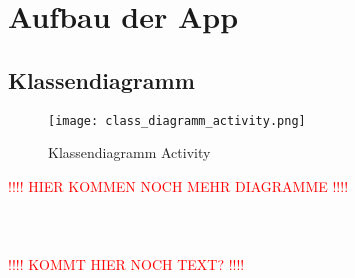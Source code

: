 \newpage
\section{Aufbau der App}

\subsection{Klassendiagramm} 

\begin{figure}[h!]
\label{fig:class_diagramm_activity}
\centering
\texttt{[image: class\_diagramm\_activity.png]} 
\caption{Klassendiagramm Activity}
\end{figure}



\textcolor{red}{!!!! HIER KOMMEN NOCH MEHR DIAGRAMME !!!!} \\ \\ \\ \\

\textcolor{red}{!!!! KOMMT HIER NOCH TEXT? !!!!}


